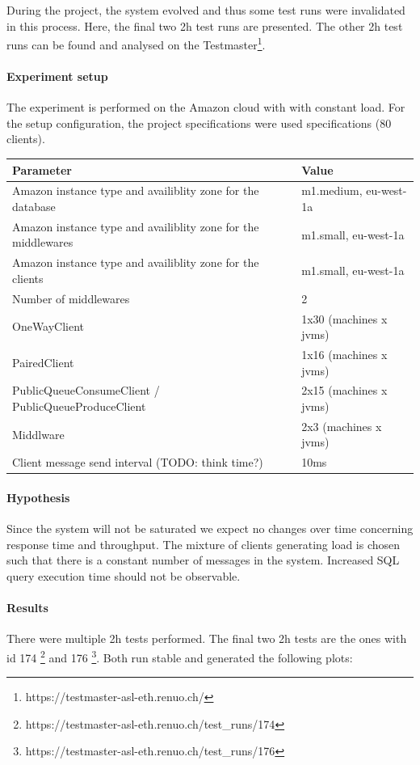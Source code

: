 \documentclass[milestone1.tex]{subfiles}
\begin{document}
During the project, the system evolved and thus some test runs were invalidated in this process. Here, the final two 2h test runs are presented. The other 2h test runs can be found and analysed on the Testmaster\footnote{https://testmaster-asl-eth.renuo.ch/}.\\

\paragraph{Experiment setup}
The experiment is performed on the Amazon cloud with with constant load. For the setup configuration, the project specifications were used specifications (80 clients).\\

\begin{tabular}{|l|l|}
\hline 
Parameter & Value \\
\hline 
Amazon instance type and availiblity zone for the database & m1.medium, eu-west-1a \\ 
Amazon instance type and availiblity zone for the middlewares & m1.small, eu-west-1a \\ 
Amazon instance type and availiblity zone for the clients & m1.small, eu-west-1a \\ 
Number of middlewares & 2 \\ 
OneWayClient & 1x30 (machines x jvms) \\ 
PairedClient & 1x16 (machines x jvms) \\ 
PublicQueueConsumeClient / PublicQueueProduceClient & 2x15 (machines x jvms) \\
Middlware & 2x3 (machines x jvms) \\ 
Client message send interval (TODO: think time?) & 10ms \\
\hline 
\end{tabular}

\paragraph{Hypothesis}
Since the system will not be saturated we expect no changes over time concerning response time and throughput. The mixture of clients generating load is chosen such that there is a constant number of messages in the system. Increased SQL query execution time should not be observable.

\paragraph{Results}
There were multiple 2h tests performed. The final two 2h tests are the ones with id 174 \footnote{https://testmaster-asl-eth.renuo.ch/test\_runs/174} and 176 \footnote{https://testmaster-asl-eth.renuo.ch/test\_runs/176}. Both run stable and generated the following plots:
\end{document}
